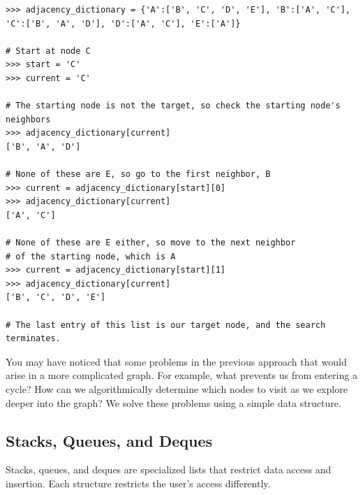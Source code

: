 \begin{lstlisting}
>>> adjacency_dictionary = {'A':['B', 'C', 'D', 'E'], 'B':['A', 'C'],
'C':['B', 'A', 'D'], 'D':['A', 'C'], 'E':['A']}

# Start at node C
>>> start = 'C'
>>> current = 'C'

# The starting node is not the target, so check the starting node's neighbors
>>> adjacency_dictionary[current]
['B', 'A', 'D']

# None of these are E, so go to the first neighbor, B
>>> current = adjacency_dictionary[start][0]
>>> adjacency_dictionary[current]
['A', 'C']

# None of these are E either, so move to the next neighbor
# of the starting node, which is A
>>> current = adjacency_dictionary[start][1]
>>> adjacency_dictionary[current]
['B', 'C', 'D', 'E']

# The last entry of this list is our target node, and the search terminates.
\end{lstlisting}

You may have noticed that some problems in the previous approach that would arise in a more complicated graph.
For example, what prevents us from entering a cycle?
How can we algorithmically determine which nodes to visit as we explore deeper into the graph?
We solve these problems using a simple data structure.


\subsection*{Stacks, Queues, and Deques}
Stacks, queues, and deques are specialized lists that restrict data access and insertion.
Each structure restricts the user's access differently.


